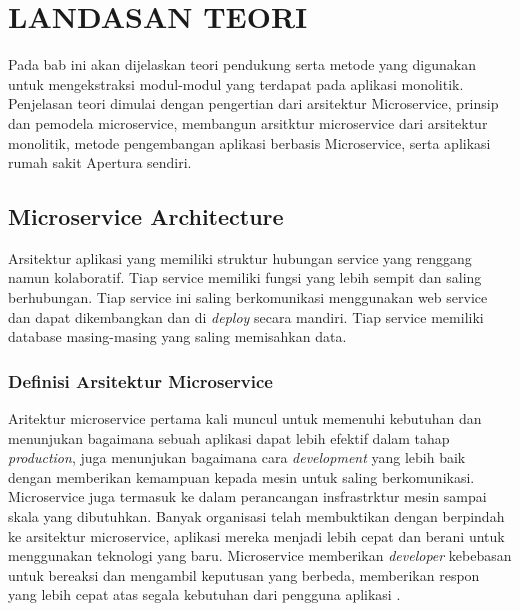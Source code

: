 \chapter{LANDASAN TEORI}
Pada bab ini akan dijelaskan teori pendukung serta metode yang digunakan untuk mengekstraksi modul-modul yang terdapat pada aplikasi monolitik. Penjelasan teori dimulai dengan pengertian dari arsitektur Microservice, prinsip dan pemodela microservice, membangun arsitktur microservice dari arsitektur monolitik, metode pengembangan aplikasi berbasis Microservice, serta aplikasi rumah sakit Apertura sendiri.

%
\vspace{4.5pt}

\section{Microservice Architecture}
Arsitektur aplikasi yang memiliki struktur hubungan service yang renggang namun kolaboratif. Tiap service memiliki fungsi yang lebih sempit dan saling berhubungan. Tiap service ini saling berkomunikasi menggunakan web service dan dapat dikembangkan dan di \textit{deploy} secara mandiri. Tiap service memiliki database masing-masing yang saling memisahkan data. 
\subsection{Definisi Arsitektur Microservice}
Aritektur microservice pertama kali muncul untuk memenuhi kebutuhan dan menunjukan bagaimana sebuah aplikasi dapat lebih efektif dalam tahap \textit{production}, juga menunjukan bagaimana cara \textit{development} yang lebih baik dengan memberikan kemampuan kepada mesin untuk saling berkomunikasi. Microservice juga termasuk ke dalam perancangan insfrastrktur mesin sampai skala yang dibutuhkan. Banyak organisasi telah membuktikan dengan berpindah ke arsitektur microservice, aplikasi mereka menjadi lebih cepat dan berani untuk menggunakan teknologi yang baru. Microservice memberikan \textit{developer} kebebasan untuk bereaksi dan mengambil keputusan yang berbeda, memberikan respon yang lebih cepat atas segala kebutuhan dari pengguna aplikasi \cite{9}.
